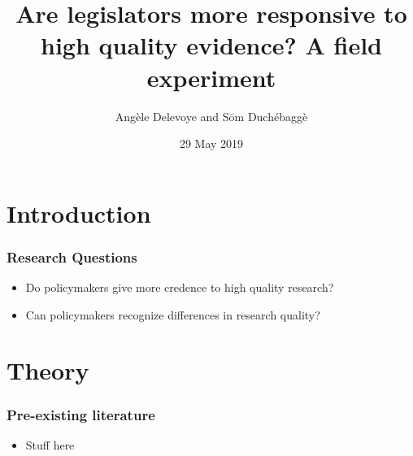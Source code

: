 \documentclass[usenames,dvipsnames]{beamer}
\title{Are legislators more responsive to high quality evidence? A field experiment}
\author{Angèle Delevoye and Sōm Duchébaggè}
\date{29 May 2019}
\begin{document}
\maketitle


\section{Introduction}

\begin{frame}
\frametitle{Research Questions}
\begin{itemize}
\item Do policymakers \textcolor{Cerulean}{give more credence} to high quality research?
\vspace{15mm}
\pause
\item Can policymakers \textcolor{Cerulean}{recognize} differences in research quality?
\end{itemize}
\end{frame}



\section{Theory}

\begin{frame}
\frametitle{Pre-existing literature}

\begin{itemize}
\item Stuff here
\end{itemize}

\end{frame}

\end{document}
